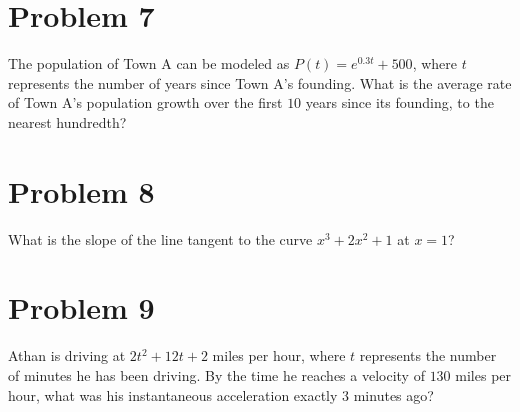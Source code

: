 \documentclass[tikz,border=10pt]{article}
\begin{document}
\section*{Problem 7}
The population of Town A can be modeled as $P(t) = e^{0.3t}+500$, where $t$ represents the number of years since Town A's founding. What is the average rate of Town A's population growth over the first $10$ years since its founding, to the nearest hundredth?

\section*{Problem 8}
What is the slope of the line tangent to the curve $x^3+2x^2+1$ at $x=1$?

\section*{Problem 9}
Athan is driving at $2t^2+12t+2$ miles per hour, where $t$ represents the number of minutes he has been driving. By the time he reaches a velocity of $130$ miles per hour, what was his instantaneous acceleration exactly $3$ minutes ago?
\end{document}

